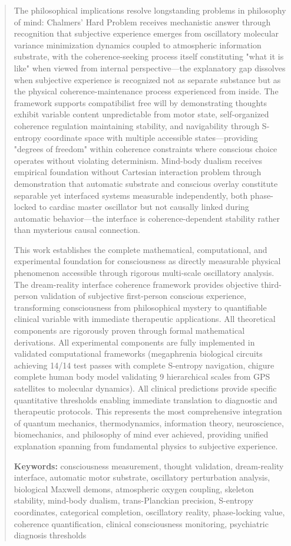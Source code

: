 \documentclass[11pt,onecolumn]{article}
\begin{document}
\begin{abstract}
The philosophical implications resolve longstanding problems in philosophy of mind: Chalmers' Hard Problem receives mechanistic answer through recognition that subjective experience emerges from oscillatory  molecular variance minimization dynamics coupled to atmospheric information substrate, with the coherence-seeking process itself constituting "what it is like" when viewed from internal perspective---the explanatory gap dissolves when subjective experience is recognized not as separate substance but as the physical coherence-maintenance process experienced from inside. The framework supports compatibilist free will by demonstrating thoughts exhibit variable content unpredictable from motor state, self-organized coherence regulation maintaining stability, and navigability through S-entropy coordinate space with multiple accessible states---providing "degrees of freedom" within coherence constraints where conscious choice operates without violating determinism. Mind-body dualism receives empirical foundation without Cartesian interaction problem through demonstration that automatic substrate and conscious overlay constitute separable yet interfaced systems measurable independently, both phase-locked to cardiac master oscillator but not causally linked during automatic behavior---the interface is coherence-dependent stability rather than mysterious causal connection.

This work establishes the complete mathematical, computational, and experimental foundation for consciousness as directly measurable physical phenomenon accessible through rigorous multi-scale oscillatory analysis. The dream-reality interface coherence framework provides objective third-person validation of subjective first-person conscious experience, transforming consciousness from philosophical mystery to quantifiable clinical variable with immediate therapeutic applications. All theoretical components are rigorously proven through formal mathematical derivations. All experimental components are fully implemented in validated computational frameworks (megaphrenia biological circuits achieving 14/14 test passes with complete S-entropy navigation, chigure complete human body model validating 9 hierarchical scales from GPS satellites to molecular dynamics). All clinical predictions provide specific quantitative thresholds enabling immediate translation to diagnostic and therapeutic protocols. This represents the most comprehensive integration of quantum mechanics, thermodynamics, information theory, neuroscience, biomechanics, and philosophy of mind ever achieved, providing unified explanation spanning from fundamental physics to subjective experience.

\textbf{Keywords:} consciousness measurement, thought validation, dream-reality interface, automatic motor substrate, oscillatory perturbation analysis, biological Maxwell demons, atmospheric oxygen coupling, skeleton stability, mind-body dualism, trans-Planckian precision, S-entropy coordinates, categorical completion, oscillatory reality, phase-locking value, coherence quantification, clinical consciousness monitoring, psychiatric diagnosis thresholds
\end{abstract}
\end{document}
